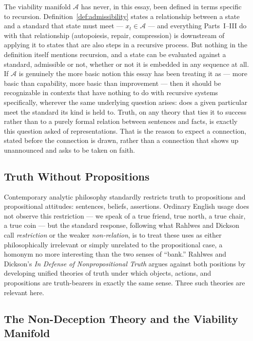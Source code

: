 \documentclass[11pt,a4paper]{article}
\theoremstyle{plain}
\theoremstyle{definition}
\theoremstyle{remark}
\newcommand{\Adm}{\mathcal{A}}
\begin{document}
The viability manifold $\Adm$ has never, in this essay, been defined in terms specific to recursion. Definition~\ref{def:admissibility} states a relationship between a state and a standard that state must meet — $x_t \in \Adm$ — and everything Parts~I--III do with that relationship (autopoiesis, repair, compression) is downstream of applying it to states that are also steps in a recursive process. But nothing in the definition itself mentions recursion, and a state can be evaluated against a standard, admissible or not, whether or not it is embedded in any sequence at all. If $\Adm$ is genuinely the more basic notion this essay has been treating it as — more basic than capability, more basic than improvement — then it should be recognizable in contexts that have nothing to do with recursive systems specifically, wherever the same underlying question arises: does a given particular meet the standard its kind is held to. Truth, on any theory that ties it to success rather than to a purely formal relation between sentences and facts, is exactly this question asked of representations. That is the reason to expect a connection, stated before the connection is drawn, rather than a connection that shows up unannounced and asks to be taken on faith.

\subsection{Truth Without Propositions}
\label{subsec:truth-without-propositions}

Contemporary analytic philosophy standardly restricts truth to propositions and propositional attitudes: sentences, beliefs, assertions. Ordinary English usage does not observe this restriction — we speak of a true friend, true north, a true chair, a true coin — but the standard response, following what Rahlwes and Dickson call \emph{restriction} or the weaker \emph{non-relation}, is to treat these uses as either philosophically irrelevant or simply unrelated to the propositional case, a homonym no more interesting than the two senses of ``bank.'' Rahlwes and Dickson's \emph{In Defense of Nonpropositional Truth} argues against both positions by developing unified theories of truth under which objects, actions, and propositions are truth-bearers in exactly the same sense. Three such theories are relevant here.

\subsection{The Non-Deception Theory and the Viability Manifold}
\label{subsec:non-deception-viability}
\end{document}
